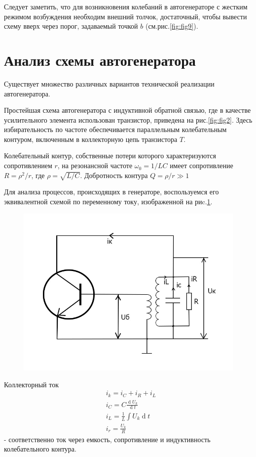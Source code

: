 Следует заметить, что для возникновения колебаний в автогенераторе с жестким режимом возбуждения необходим внешний толчок, достаточный, чтобы вывести схему вверх через порог, задаваемый точкой $b$ (см.рис.\ref{fig:fig9}).

\section{Анализ схемы автогенератора}

Существует множество различных вариантов технической реализации автогенератора.

Простейшая схема автогенератора с индуктивной обратной связью, где в качестве усилительного элемента использован транзистор, приведена на рис.\ref{fig:fig2}. Здесь избирательность по частоте обеспечивается параллельным колебательным контуром, включенным в коллекторную цепь транзистора $T$.

Колебательный контур, собственные потери которого характеризуются сопротивлением $r$, на резонансной частоте $\omega_0=1/{LC}$ имеет сопротивление $R=\rho^2/r$, где $\rho=\sqrt{L/C}$. Добротность контура $Q=\rho/r\gg1$

Для анализа процессов, происходящих в генераторе, воспользуемся его эквивалентной схемой по переменному току, изображенной на риc.\ref{fig:fig12}.

\begin{figure}[h]
	\centering
	\includegraphics[width=0.7\linewidth]{circuit/fig12}
	\caption{}
	\label{fig:fig12}
\end{figure}

Коллекторный ток
\begin{equation*}
\begin{aligned}
&i_k=i_C+i_R+i_L \\
&i_C=C\frac{\operatorname dU_k}{\operatorname dt} \\
&i_L=\frac{1}{L}\int U_k \operatorname dt \\
&i_r=\frac{U_k}{R}
\end{aligned}
\end{equation*}
- соответственно ток через емкость, сопротивление и индуктивность колебательного контура.


